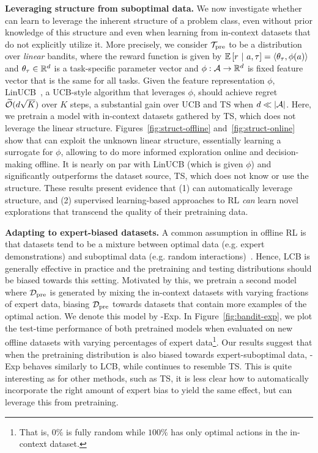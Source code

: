 \textbf{Leveraging structure from suboptimal data.} We now investigate whether \macroName{} can learn to leverage the inherent structure of a problem class, even without prior knowledge of this structure and even when learning from in-context datasets that do not explicitly utilize it. More precisely, we consider ${\mathcal{T}}_{\text{pre}}$ to be a distribution over \emph{linear} bandits, where the reward function is given by $\mathbb{E}\left[r \ | \ a, \tau \right] =  \langle{\theta_\tau},{\phi(a)}\rangle$ and $\theta_\tau \in \mathbb{R}^d$ is a task-specific parameter vector and $\phi: \mathcal{A} \to \mathbb{R}^d$ is fixed feature vector that is the same for all tasks. 
Given the feature representation $\phi$, LinUCB~\citep{abbasi2011improved}, a UCB-style algorithm that leverages $\phi$, should achieve regret $\widetilde{\mathcal{O}}(d\sqrt{ K})$ over $K$ steps, a substantial gain over UCB and TS when $d \ll |\mathcal{A}|$. %
Here, we pretrain a \macroName{} model with in-context datasets gathered by TS, which does not leverage the linear structure. Figures~\ref{fig:struct-offline} and~\ref{fig:struct-online} show that \macroName{} can exploit the unknown linear structure, essentially learning a surrogate for $\phi$, allowing to do more informed exploration online and decision-making offline. 
It is nearly on par with LinUCB (which is given $\phi$) and significantly outperforms the dataset source, TS, which does not know or use the structure. These results present evidence that (1) \macroName{} can automatically leverage structure, and (2) supervised learning-based approaches to RL \emph{can} learn novel explorations that transcend the quality of their pretraining data. 


\textbf{Adapting to expert-biased datasets.}
A common assumption in offline RL is that datasets tend to be a mixture between optimal data (e.g. expert demonstrations) and suboptimal data (e.g. random interactions)~\citep{rashidinejad2021bridging}. Hence, LCB is generally effective in practice and the pretraining and testing distributions should be biased towards this setting. Motivated by this, we 
pretrain a second \macroName{} model where $\mathcal{D}_{\text{pre}}$ is generated by mixing the in-context datasets with varying fractions of expert data, biasing $\mathcal{D}_{\text{pre}}$ towards datasets that contain more examples of the optimal action. We denote this model by \macroName{}-Exp. In Figure~\ref{fig:bandit-exp}, we plot the test-time performance of both pretrained models when evaluated on new offline datasets with varying percentages of expert data\footnote{That is, $0\%$ is fully random while $100\%$ has only optimal actions in the in-context dataset.}. Our results suggest that when the pretraining distribution is also biased towards expert-suboptimal data, \macroName{}-Exp behaves similarly to LCB, while \macroName{} continues to resemble TS. This is quite interesting as for other methods, such as TS, it is less clear how to automatically incorporate the right amount of expert bias to yield the same effect, but \macroName{} can leverage this from pretraining.






